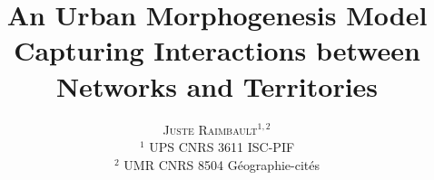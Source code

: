 \documentclass[11pt]{article}
\newcommand{\noun}[1]{\textsc{#1}}
\begin{document}
\title{An Urban Morphogenesis Model Capturing Interactions between Networks and Territories}
\author{\noun{Juste Raimbault}$^{1,2}$\\
$^1$ UPS CNRS 3611 ISC-PIF\\
$^2$ UMR CNRS 8504 G{\'e}ographie-cit{\'e}s
}
\date{}

\maketitle

\justify


\end{document}
